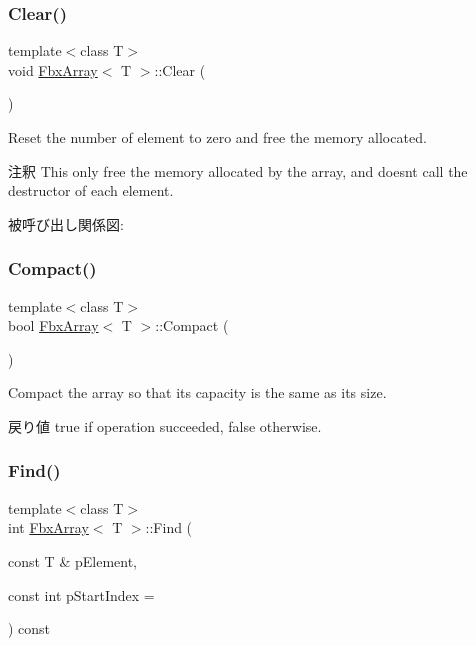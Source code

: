\subsubsection{\texorpdfstring{Clear()}{Clear()}}
{\footnotesize\ttfamily template$<$class T$>$ \\
void \hyperlink{class_fbx_array}{Fbx\+Array}$<$ T $>$\+::Clear (\begin{DoxyParamCaption}{ }\end{DoxyParamCaption})}

Reset the number of element to zero and free the memory allocated. \begin{DoxyRemark}{注釈}
This only free the memory allocated by the array, and doesn\textquotesingle{}t call the destructor of each element. 
\end{DoxyRemark}
被呼び出し関係図\+:
\mbox{\label{class_fbx_array_af841a63f9f07b47630ccae34aee7b97a}} 
\subsubsection{\texorpdfstring{Compact()}{Compact()}}
{\footnotesize\ttfamily template$<$class T$>$ \\
bool \hyperlink{class_fbx_array}{Fbx\+Array}$<$ T $>$\+::Compact (\begin{DoxyParamCaption}{ }\end{DoxyParamCaption})}

Compact the array so that its capacity is the same as its size. \begin{DoxyReturn}{戻り値}
{\ttfamily true} if operation succeeded, {\ttfamily false} otherwise. 
\end{DoxyReturn}
\mbox{\label{class_fbx_array_a3f49660f02887b59d7e66ed09aa0d1cb}} 
\subsubsection{\texorpdfstring{Find()}{Find()}}
{\footnotesize\ttfamily template$<$class T$>$ \\
int \hyperlink{class_fbx_array}{Fbx\+Array}$<$ T $>$\+::Find (\begin{DoxyParamCaption}\item[{const T \&}]{p\+Element,  }\item[{const int}]{p\+Start\+Index = {} }\end{DoxyParamCaption}) const}

